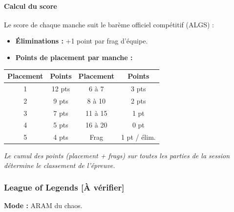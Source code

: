 \documentclass[11pt,a4paper]{article}
\begin{document}
    \paragraph{Calcul du score}
    Le score de chaque manche suit le barème officiel compétitif (ALGS) :
    \begin{itemize}
        \item \textbf{Éliminations :} +1 point par frag d'équipe.
        \item \textbf{Points de placement par manche :}
    \end{itemize}

    \begin{center}
        \begin{tabular}{|c|c||c|c|}
            \hline
            \textbf{Placement} & \textbf{Points} & \textbf{Placement} & \textbf{Points} \\
            \hline
            1\ier{}            & 12 pts          & 6\ieme{} à 7\ieme{}   & 3 pts           \\
            2\ieme{}           & 9 pts           & 8\ieme{} à 10\ieme{}  & 2 pts           \\
            3\ieme{}           & 7 pts           & 11\ieme{} à 15\ieme{} & 1 pt            \\
            4\ieme{}           & 5 pts           & 16\ieme{} à 20\ieme{} & 0 pt            \\
            5\ieme{}           & 4 pts           & Frag                   & 1 pt / élim.    \\
            \hline
        \end{tabular}
    \end{center}

    \textit{Le cumul des points (placement + frags) sur toutes les parties de la session détermine le classement de l'épreuve.}

    \subsubsection{League of Legends [À vérifier]}
    \textbf{Mode :} ARAM du chaos.
\end{document}
